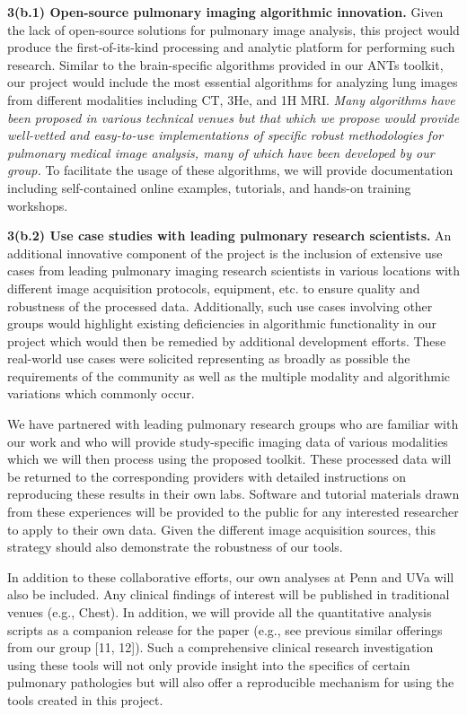 \documentclass[11pt,]{article}
\begin{document}
\textbf{3(b.1) Open-source pulmonary imaging algorithmic innovation.}
Given the lack of open-source solutions for pulmonary image analysis,
this project would produce the first-of-its-kind processing and analytic
platform for performing such research. Similar to the brain-specific
algorithms provided in our ANTs toolkit, our project would include the
most essential algorithms for analyzing lung images from different
modalities including CT, 3He, and 1H MRI. \emph{Many algorithms have
been proposed in various technical venues but that which we propose
would provide well-vetted and easy-to-use implementations of specific
robust methodologies for pulmonary medical image analysis, many of which
have been developed by our group.} To facilitate the usage of these
algorithms, we will provide documentation including self-contained
online examples, tutorials, and hands-on training workshops.

\textbf{3(b.2) Use case studies with leading pulmonary research
scientists.} An additional innovative component of the project is the
inclusion of extensive use cases from leading pulmonary imaging research
scientists in various locations with different image acquisition
protocols, equipment, etc. to ensure quality and robustness of the
processed data. Additionally, such use cases involving other groups
would highlight existing deficiencies in algorithmic functionality in
our project which would then be remedied by additional development
efforts. These real-world use cases were solicited representing as
broadly as possible the requirements of the community as well as the
multiple modality and algorithmic variations which commonly occur.

We have partnered with leading pulmonary research groups who are
familiar with our work and who will provide study-specific imaging data
of various modalities which we will then process using the proposed
toolkit. These processed data will be returned to the corresponding
providers with detailed instructions on reproducing these results in
their own labs. Software and tutorial materials drawn from these
experiences will be provided to the public for any interested researcher
to apply to their own data. Given the different image acquisition
sources, this strategy should also demonstrate the robustness of our
tools.

In addition to these collaborative efforts, our own analyses at Penn and
UVa will also be included. Any clinical findings of interest will be
published in traditional venues (e.g., Chest). In addition, we will
provide all the quantitative analysis scripts as a companion release for
the paper (e.g., see previous similar offerings from our group {[}11,
12{]}). Such a comprehensive clinical research investigation using these
tools will not only provide insight into the specifics of certain
pulmonary pathologies but will also offer a reproducible mechanism for
using the tools created in this project.
\end{document}
